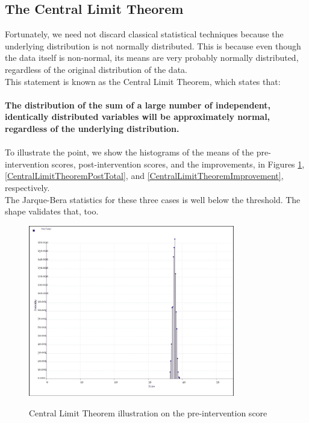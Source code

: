 \documentclass[10pt]{article}
\begin{document}
\subsection{The Central Limit Theorem}
Fortunately, we need not discard classical statistical techniques because the underlying distribution is not normally distributed. This is because even though the data itself is non-normal, its means are very probably normally distributed, regardless of the original distribution of the data.\\
This statement is known as the Central Limit Theorem, which states that:\\\\
\textbf{The distribution of the sum of a large number of independent, identically distributed variables will be approximately normal, regardless of the underlying distribution.}\\\\
To illustrate the point, we show the histograms of the means of the pre-intervention scores, post-intervention scores, and the improvements, in Figures \ref{CentralLimitTheoremPreTotal}, \ref{CentralLimitTheoremPostTotal}, and \ref{CentralLimitTheoremImprovement}, respectively.\\
The Jarque-Bera statistics for these three cases is well below the threshold. The shape validates that, too.
\begin{figure}
\caption{Central Limit Theorem illustration on the pre-intervention score}
\label{CentralLimitTheoremPreTotal}
\begin{center}
\includegraphics[width=90mm]{ReportMedia/CentralLimitTheoremPreTotal.jpg}\\
\end{center}
\end{figure}
\end{document}
